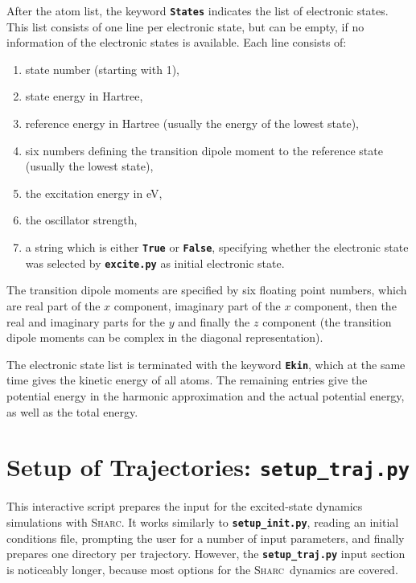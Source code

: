 \documentclass[a4paper,10pt,DIV=15,openany]{scrbook}
\newcommand{\sharc}{\textsc{Sharc}}
\newcommand{\ttt}[1]{\textbf{\texttt{#1}}}
\begin{document}
After the atom list, the keyword \ttt{States} indicates the list of electronic states. This list consists of one line per electronic state, but can be empty, if no information of the electronic states is available. Each line consists of: 
\begin{enumerate}
  \item state number (starting with 1),
  \item state energy in Hartree, 
  \item reference energy in Hartree (usually the energy of the lowest state),
  \item six numbers defining the transition dipole moment to the reference state (usually the lowest state),
  \item the excitation energy in eV,
  \item the oscillator strength,
  \item a string which is either \ttt{True} or \ttt{False}, specifying whether the electronic state was selected by \ttt{excite.py} as initial electronic state. 
\end{enumerate}
The transition dipole moments are specified by six floating point numbers, which are real part of the $x$ component, imaginary part of the $x$ component, then the real and imaginary parts for the $y$ and finally the $z$ component (the transition dipole moments can be complex in the diagonal representation). 

The electronic state list is terminated with the keyword \ttt{Ekin}, which at the same time gives the kinetic energy of all atoms. The remaining entries give the potential energy in the harmonic approximation and the actual potential energy, as well as the total energy.








\section{Setup of Trajectories: \ttt{setup\_traj.py}}\label{sec:setup_traj.py}

This interactive script prepares the input for the excited-state dynamics simulations with \sharc. It works similarly to \ttt{setup\_init.py}, reading an initial conditions file, prompting the user for a number of input parameters, and finally prepares one directory per trajectory. However, the \ttt{setup\_traj.py} input section is noticeably longer, because most options for the \sharc\ dynamics are covered.
\end{document}
